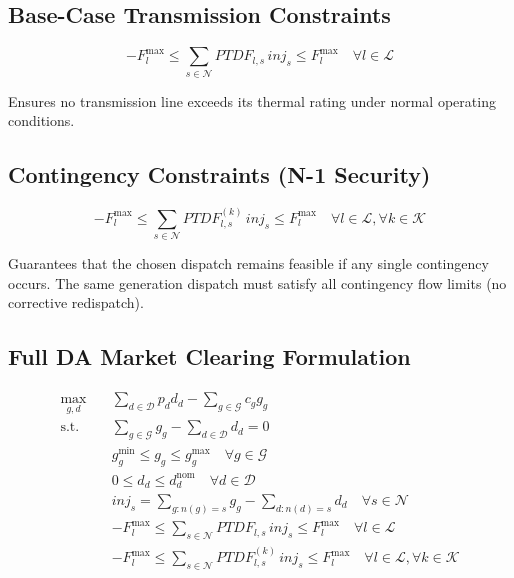 \documentclass[11pt]{article}
\begin{document}
\subsection{Base-Case Transmission Constraints}

\begin{equation}
- F_l^{\max}
\le
\sum_{s \in \mathcal{N}} PTDF_{l,s} \, inj_s
\le
F_l^{\max}
\quad \forall l \in \mathcal{L}
\end{equation}

 
Ensures no transmission line exceeds its thermal rating under normal operating conditions.

\subsection{ Contingency Constraints (N-1 Security)}

\begin{equation}
- F_l^{\max}
\le
\sum_{s \in \mathcal{N}} PTDF_{l,s}^{(k)} \, inj_s
\le
F_l^{\max}
\quad \forall l \in \mathcal{L}, \forall k \in \mathcal{K}
\end{equation}

 
Guarantees that the chosen dispatch remains feasible if any single contingency occurs.  
The same generation dispatch must satisfy all contingency flow limits (no corrective redispatch).

\subsection{Full DA Market Clearing Formulation}

\begin{align}
\max_{g,d} \quad
& \sum_{d \in \mathcal{D}} p_d d_d
- \sum_{g \in \mathcal{G}} c_g g_g
\\[6pt]
\text{s.t.} \quad
& \sum_{g \in \mathcal{G}} g_g
-
\sum_{d \in \mathcal{D}} d_d
= 0
\\[6pt]
& g_g^{\min} \le g_g \le g_g^{\max}
\quad \forall g \in \mathcal{G}
\\[6pt]
& 0 \le d_d \le d_d^{\text{nom}}
\quad \forall d \in \mathcal{D}
\\[6pt]
& inj_s =
\sum_{g: n(g)=s} g_g
-
\sum_{d: n(d)=s} d_d
\quad \forall s \in \mathcal{N}
\\[6pt]
& -F_l^{\max}
\le
\sum_{s \in \mathcal{N}} PTDF_{l,s}\,inj_s
\le
F_l^{\max}
\quad \forall l \in \mathcal{L}
\\[6pt]
& -F_l^{\max}
\le
\sum_{s \in \mathcal{N}} PTDF_{l,s}^{(k)}\,inj_s
\le
F_l^{\max}
\quad \forall l \in \mathcal{L}, \forall k \in \mathcal{K}
\end{align}
\end{document}
